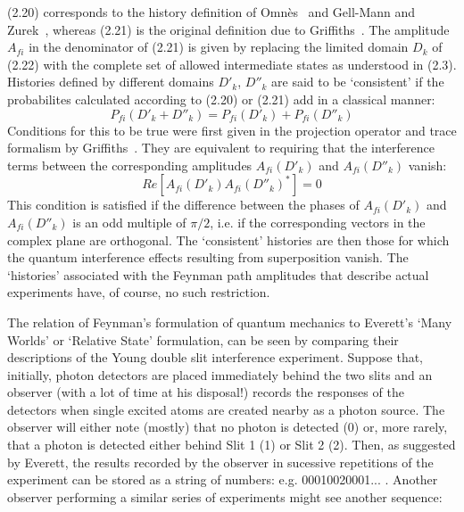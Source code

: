 \documentclass [12pt]{article}
\begin{document}
{  (2.20) corresponds to the history definition of Omn\`{e}s~\cite{Omnes} and
   Gell-Mann and Zurek~\cite{GMH}, whereas (2.21) is the original definition due to 
   Griffiths~\cite{Griffiths}. The amplitude $A_{fi}$ in the denominator of (2.21)
   is given by replacing the limited domain $D_k$ of (2.22) with the complete set of allowed
   intermediate states as understood in (2.3). Histories defined by different domains
   $D'_k$, $D''_k$ are said to be `consistent' if the probabilites calculated according to
  (2.20) or (2.21) add in a classical manner:
  \begin{equation}
  P_{fi}(D'_k +D''_k) =  P_{fi}(D'_k) +  P_{fi}(D''_k) 
  \end{equation}  
   Conditions for this to be true were first given in the projection operator and
   trace formalism by Griffiths~\cite{Griffiths}. They are equivalent to requiring that
    the interference terms between the corresponding amplitudes $A_{fi}(D'_k)$ and 
    $A_{fi}(D''_k)$ vanish:
   \begin{equation}
  Re\left[A_{fi}(D'_k)A_{fi}(D''_k)^{\ast}\right] = 0
   \end{equation}
   This condition is satisfied if the difference between the phases of $A_{fi}(D'_k)$ and 
    $A_{fi}(D''_k)$ is an odd multiple of $\pi/2$, i.e. if the corresponding vectors in 
   the complex plane are orthogonal. The `consistent' histories are then those for which
   the quantum interference effects resulting from superposition vanish. The `histories'
   associated with the  Feynman path amplitudes that describe actual experiments have,
   of course, no such restriction.
   \par The relation of Feynman's formulation of quantum mechanics to Everett's
    `Many Worlds' or `Relative State' formulation, can be
   seen by comparing their descriptions of the Young double slit interference
   experiment. Suppose that, initially, photon detectors are placed immediately
   behind the two slits and an observer (with a lot of time at his disposal!) records
   the responses of the detectors when single excited atoms are created nearby as
   a photon source. The observer will either note (mostly) that no photon is detected (0)
   or, more rarely, that a photon is detected either behind Slit 1 (1) or Slit 2 (2).
   Then, as suggested by Everett, the results recorded by the observer in sucessive
   repetitions of the experiment can be stored as a string of numbers: e.g. 00010020001... .
 Another observer performing a similar series of experiments might see another sequence:
}
\end{document}
